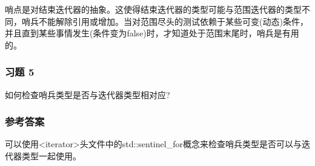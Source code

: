 哨点是对结束迭代器的抽象。这使得结束迭代器的类型可能与范围迭代器的类型不同，哨兵不能解除引用或增加。当对范围尽头的测试依赖于某些可变(动态)条件，并且直到某些事情发生(条件变为false)时，才知道处于范围末尾时，哨兵是有用的。

\subsubsection{习题 5}

如何检查哨兵类型是否与迭代器类型相对应?

\subsubsection{参考答案}

可以使用<iterator>头文件中的std::sentinel\_for概念来检查哨兵类型是否可以与迭代器类型一起使用。












